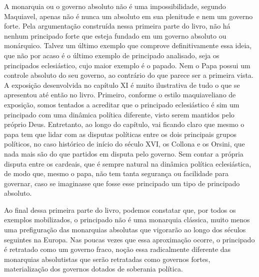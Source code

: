 A monarquia ou o governo absoluto não é uma impossibilidade, segundo
Maquiavel, apenas não é nunca um absoluto em sua plenitude e nem um
governo forte. Pela argumentação construída nessa primeira parte do
livro, não há nenhum principado forte que esteja fundado em um governo
absoluto ou monárquico. Talvez um último exemplo que comprove
definitivamente essa ideia, que não por acaso é o último exemplo de
principado analisado, seja os principados eclesiástico, cujo maior
exemplo é o papado. Nem o Papa possui um controle absoluto do seu
governo, ao contrário do que parece ser a primeira vista. A exposição
desenvolvida no capítulo XI é muito ilustrativa de tudo o que se
apresentou até então no livro. Primeiro, conforme o estilo maquiaveliano
de exposição, somos tentados a acreditar que o principado eclesiástico é
sim um principado com uma dinâmica política diferente, visto serem
mantidos pelo próprio Deus. Entretanto, ao longo do capítulo, vai
ficando claro que mesmo o papa tem que lidar com as disputas políticas
entre os dois principais grupos políticos, no caso histórico de início
do século XVI, os Collona e os Orsini, que nada mais são do que partidos
em disputa pelo governo. Sem contar a própria disputa entre os cardeais,
que é sempre natural na dinâmica política eclesiástica, de modo que,
mesmo o papa, não tem tanta segurança ou facilidade para governar, caso
se imaginasse que fosse esse principado um tipo de principado absoluto.

Ao final dessa primeira parte do livro, podemos constatar que, por todos
os exemplos mobilizados, o principado não é uma monarquia clássica,
muito menos uma prefiguração das monarquias absolutas que vigorarão ao
longo dos séculos seguintes na Europa. Nas poucas vezes que essa
aproximação ocorre, o principado é retratado como um governo fraco,
noção essa radicalmente diferente das monarquias absolutistas que serão
retratadas como governos fortes, materialização dos governos dotados de
soberania política.


